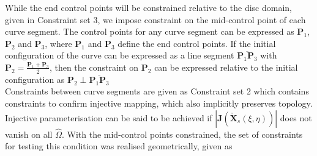 While the end control points will be constrained relative to the disc domain, given in Constraint set 3, we impose constraint on the mid-control point of each curve segment. The control points for any curve segment can be expressed as $\bm P_1$, $\bm P_2$ and $\bm P_3$, where $\bm P_1$ and $\bm P_3$ define the end control points. If the initial configuration of the curve can be expressed as a line segment $\overline{\bm P_1\bm P_3}$ with $\bm P_2 = \frac{\bm P_1+\bm P_3}{2}$, then the constraint on $\bm P_2$ can be expressed relative to the initial configuration as $\bm P_2 \perp \overline{\bm P_1\bm P_3}$\\


Constraints between curve segments are given as Constraint set 2 which contains constraints to confirm injective mapping, which also implicitly preserves topology.
Injective parameterisation can be said to be achieved if $ |\bm J( \bm {\check{X}}_{s}(\xi,\eta) )|$ does not vanish on all $\hat{\Omega}$.
With the mid-control points constrained, the set of constraints for testing this condition was realised geometrically, given as\\
 
